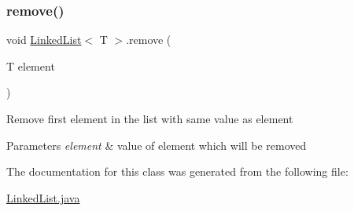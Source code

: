 \subsubsection{\texorpdfstring{remove()}{remove()}}
{\footnotesize\ttfamily void \mbox{\hyperlink{class_linked_list}{Linked\+List}}$<$ T $>$.remove (\begin{DoxyParamCaption}\item[{T}]{element }\end{DoxyParamCaption})\hspace{0.3cm}{\ttfamily [inline]}}

Remove first element in the list with same value as element 
\begin{DoxyParams}{Parameters}
{\em element} & value of element which will be removed \\
\hline
\end{DoxyParams}


The documentation for this class was generated from the following file\+:\begin{DoxyCompactItemize}
\item 
\mbox{\hyperlink{_linked_list_8java}{Linked\+List.\+java}}\end{DoxyCompactItemize}
